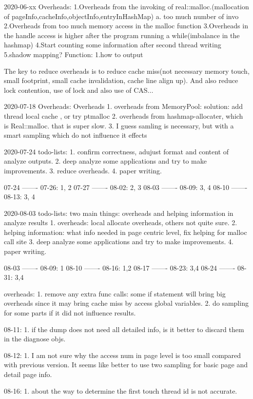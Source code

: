 2020-06-xx
Overheads:
1.Overheads from the invoking of real::malloc.(mallocation of pageInfo,cacheInfo,objectInfo,entryInHashMap)
a. too much number of invo
2.Overheads from too much memory access in the malloc function
3.Overheads in the handle access is higher after the program running a while(imbalance in the hashmap)
4.Start counting some information after second thread writing
5.shadow mapping?
Function:
1.how to output

The key to reduce overheads is to reduce cache miss(not necessary memory touch, small footprint, small cache invalidation, cache line align up).
And also reduce lock contention, use of lock and also use of CAS...


2020-07-18 Overheads:
Overheads
1. overheads from MemoryPool:
solution: add thread local cache , or try ptmalloc
2. overheads from hashmap-allocater, which is Real::malloc. that is super slow.
3. I guess samling is necessary, but with a smart sampling which do not influence it effects




2020-07-24 todo-lists:
1. confirm correctness, adujust format and content of analyze outputs.
2. deep analyze some applications and try to make improvements.
3. reduce overheads.
4. paper writing.

07-24 ------- 07-26: 1, 2
07-27 ------- 08-02: 2, 3
08-03 ------- 08-09: 3, 4
08-10 ------- 08-13: 3, 4

2020-08-03 todo-lists:
two main things: overheads and helping information in analyze results
    1. overheads: local allocate overheads, others not quite sure.
    2. helping information: what info needed in page centric level, fix helping for malloc call site
    3. deep analyze some applications and try to make improvements.
    4. paper writing.

08-03 ------- 08-09: 1
08-10 ------- 08-16: 1,2
08-17 ------- 08-23: 3,4
08-24 ------- 08-31: 3,4


overheads:
    1. remove any extra func calls: some if statement will bring big overheads since it may bring cache miss by access global variables.
    2. do sampling for some parts if it did not influence results.


08-11:
    1. if the dump does not need all detailed info, is it better to discard them in the diagnose objs.

08-12:
    1. I am not sure why the access num in page level is too small compared with previous version. It seems like better to use two
sampling for basic page and detail page info.

08-16:
    1. about the way to determine the first touch thread id is not accurate.